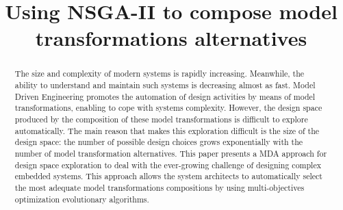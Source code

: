 \documentclass[conference]{IEEEtran}
\begin{document}
\title{Using NSGA-II to compose model transformations alternatives }

 \author{



}

\maketitle

\begin{abstract}
The size and complexity of modern systems is rapidly increasing. Meanwhile, the ability to understand and maintain such systems is decreasing almost as fast.
Model Driven Engineering promotes the automation of design activities by means of model transformations, enabling to cope with systems complexity. However, the design space produced by the composition of these model transformations is difficult to explore automatically. The main reason that makes this exploration difficult is the size of the design space: the number of possible design choices grows exponentially with the number of model transformation alternatives.
This paper presents a MDA approach for design space exploration to deal with the ever-growing challenge of designing complex embedded systems. This approach allows the system architects to automatically select the most adequate model transformations compositions by using multi-objectives optimization evolutionary algorithms.

\end{abstract}
\end{document}
